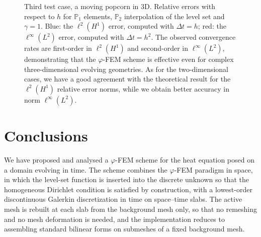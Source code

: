 \documentclass[11pt,a4paper]{article}
\theoremstyle{plain}
\theoremstyle{definition}
\theoremstyle{remark}
\numberwithin{equation}{section}
\newcommand{\logLogSlopeTriangle}[5]
{

    \pgfplotsextra
    {
        \pgfkeysgetvalue{/pgfplots/xmin}{\xmin}
        \pgfkeysgetvalue{/pgfplots/xmax}{\xmax}
        \pgfkeysgetvalue{/pgfplots/ymin}{\ymin}
        \pgfkeysgetvalue{/pgfplots/ymax}{\ymax}

        \pgfmathsetmacro{\xArel}{#1}
        \pgfmathsetmacro{\yArel}{#3}
        \pgfmathsetmacro{\xBrel}{#1-#2}
        \pgfmathsetmacro{\yBrel}{\yArel}
        \pgfmathsetmacro{\xCrel}{\xArel}

        \pgfmathsetmacro{\lnxB}{\xmin*(1-(#1-#2))+\xmax*(#1-#2)} %
        \pgfmathsetmacro{\lnxA}{\xmin*(1-#1)+\xmax*#1} %
        \pgfmathsetmacro{\lnyA}{\ymin*(1-#3)+\ymax*#3} %
        \pgfmathsetmacro{\lnyC}{\lnyA+#4*(\lnxA-\lnxB)}
        \pgfmathsetmacro{\yCrel}{(\lnyC-\ymin)/(\ymax-\ymin)} %

        \coordinate (A) at (rel axis cs:\xArel,\yArel);
        \coordinate (B) at (rel axis cs:\xBrel,\yBrel);
        \coordinate (C) at (rel axis cs:\xCrel,\yCrel);

        \draw[#5]   (A)-- node[pos=0.5,anchor=north] {1}
                    (B)--
                    (C)-- node[pos=0.5,anchor=west] {#4}
                    cycle;
    }
}
\begin{document}
\begin{figure}
    \centering
    
    \caption{Third test case, a moving {popcorn} in 3D. Relative errors with respect to $h$ for $\mathbb{P}_1$ elements, $\mathbb{P}_2$ interpolation of the level set and $\gamma=1$. Blue: the $\ell^2(H^1)$ error, computed with $\Delta t = h$; red: the $\ell^\infty(L^2)$ error, computed with $\Delta t = h^2$. The observed convergence rates are first-order in $\ell^2(H^1)$ and second-order in $\ell^\infty(L^2)$, demonstrating that the $\varphi$-FEM scheme is effective even for complex three-dimensional evolving geometries. As for the two-dimensional cases, we have a good agreement with the theoretical result for the $\ell^2(H^1)$ relative error norms, while we obtain better accuracy in norm $\ell^\infty(L^2)$.}
    \label{fig:convergence3}
\end{figure}

\section{Conclusions}
\label{Sect:Conclusion}

We have proposed and analysed a $\varphi$-FEM scheme for the heat equation posed on a domain evolving in time. The scheme combines the $\varphi$-FEM paradigm in space, in which the level-set function is inserted into the discrete unknown so that the homogeneous Dirichlet condition is satisfied by construction, with a lowest-order discontinuous Galerkin discretization in time on space--time slabs. The active mesh is rebuilt at each slab from the background mesh only, so that no remeshing and no mesh deformation is needed, and the implementation reduces to assembling standard bilinear forms on submeshes of a fixed background mesh.
\end{document}
